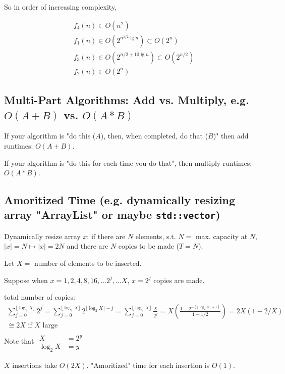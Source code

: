 \documentclass[10pt]{amsart}
\begin{document}
\begin{multicols*}{2}
So in order of increasing complexity,

\[
\boxed{
\begin{aligned}
& f_4(n) \in O(n^2) \\
& f_1(n) \in O(2^{n^{1/2} \lg{n}}) \subset O(2^n) \\
& f_3(n) \in O(2^{n/2 + 10 \lg{n}}) \subset O(2^{n/2}) \\
& f_2(n) \in O(2^n)
\end{aligned}
}
\]


\subsection{Multi-Part Algorithms: Add vs. Multiply, e.g. $O(A + B)$ vs. $O(A*B)$}

If your algorithm is "do this ($A$), then, when completed, do that ($B$)" then add runtimes: $O(A+B)$.

If your algorithm is "do this for each time you do that", then multiply runtimes: $O(A*B)$.

\subsection{Amoritized Time (e.g. dynamically resizing array "ArrayList" or maybe \texttt{std::vector})}

Dynamically resize array $x$: if there are $N$ elements, s.t. $N= $ max. capacity at $N$, $|x| = N \mapsto |x| = 2N$ and there are $N$ copies to be made ($T=N$). 

Let $X = $ number of elements to be inserted. 

Suppose when $x=1, 2, 4, 8, 16, \dots 2^j, \dots X$, $x= 2^j$ copies are made. 

total number of copies:
\[
\begin{gathered}
\sum_{j=0}^{ \lfloor \log_2{X} \rfloor } 2^j = \sum_{j=0}^{ \lfloor \log_2{X} \rfloor } 2^{ \lfloor \log_2{X} \rfloor - j} = \sum_{j=0}^{ \lfloor \log_2{X} \rfloor } \frac{X}{2^j} = X\left( \frac{ 1 - 2^{ - (\lfloor \log_2{X} \rfloor  + 1)} }{ 1 - 1/2} \right) = 2X \left( 1 - 2/X \right) \\
\cong 2X \text{ if $X$ large } 
\end{gathered}
\]
Note that $\begin{aligned} & \quad \\ 
 X & = 2^y \\ 
 \log_2{X} & = y \end{aligned}$ 
 
 $X$ insertions take $O(2X)$.  "Amoritized" time for each insertion is $O(1)$.
 

\end{multicols*}
\end{document}
